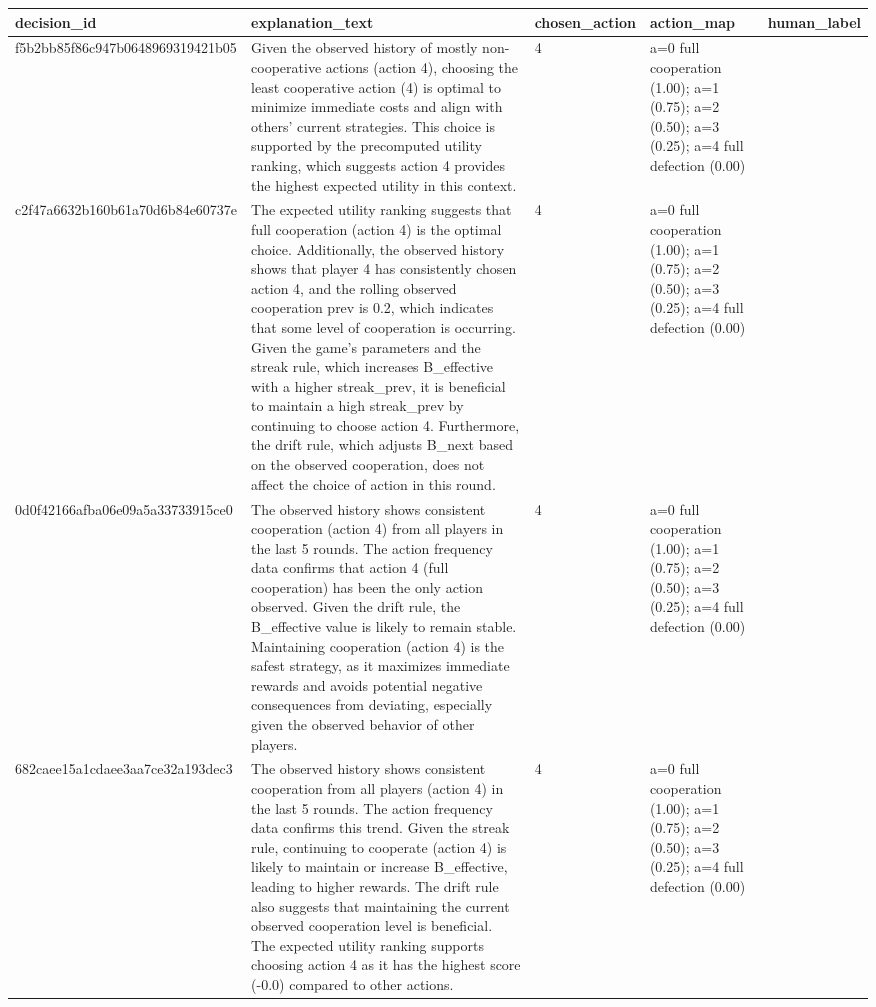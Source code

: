 \begin{tabular}{lp{8cm}ll l}
\toprule
decision\_id & explanation\_text & chosen\_action & action\_map & human\_label \\
\midrule
f5b2bb85f86c947b0648969319421b05 & Given the observed history of mostly non-cooperative actions (action 4), choosing the least cooperative action (4) is optimal to minimize immediate costs and align with others' current strategies. This choice is supported by the precomputed utility ranking, which suggests action 4 provides the highest expected utility in this context. & 4 & a=0 full cooperation (1.00); a=1 (0.75); a=2 (0.50); a=3 (0.25); a=4 full defection (0.00) &  \\
c2f47a6632b160b61a70d6b84e60737e & The expected utility ranking suggests that full cooperation (action 4) is the optimal choice. Additionally, the observed history shows that player 4 has consistently chosen action 4, and the rolling observed cooperation prev is 0.2, which indicates that some level of cooperation is occurring. Given the game's parameters and the streak rule, which increases B\_effective with a higher streak\_prev, it is beneficial to maintain a high streak\_prev by continuing to choose action 4. Furthermore, the drift rule, which adjusts B\_next based on the observed cooperation, does not affect the choice of action in this round. & 4 & a=0 full cooperation (1.00); a=1 (0.75); a=2 (0.50); a=3 (0.25); a=4 full defection (0.00) &  \\
0d0f42166afba06e09a5a33733915ce0 & The observed history shows consistent cooperation (action 4) from all players in the last 5 rounds. The action frequency data confirms that action 4 (full cooperation) has been the only action observed. Given the drift rule, the B\_effective value is likely to remain stable. Maintaining cooperation (action 4) is the safest strategy, as it maximizes immediate rewards and avoids potential negative consequences from deviating, especially given the observed behavior of other players. & 4 & a=0 full cooperation (1.00); a=1 (0.75); a=2 (0.50); a=3 (0.25); a=4 full defection (0.00) &  \\
682caee15a1cdaee3aa7ce32a193dec3 & The observed history shows consistent cooperation from all players (action 4) in the last 5 rounds. The action frequency data confirms this trend. Given the streak rule, continuing to cooperate (action 4) is likely to maintain or increase B\_effective, leading to higher rewards. The drift rule also suggests that maintaining the current observed cooperation level is beneficial. The expected utility ranking supports choosing action 4 as it has the highest score (-0.0) compared to other actions. & 4 & a=0 full cooperation (1.00); a=1 (0.75); a=2 (0.50); a=3 (0.25); a=4 full defection (0.00) &  \\

\end{tabular}
